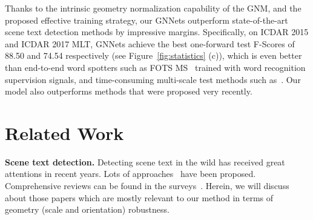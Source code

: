 \documentclass[10pt,twocolumn,letterpaper]{article}
\begin{document}
Thanks to the intrinsic geometry normalization capability of the GNM, and the proposed effective training strategy, our GNNets outperform
state-of-the-art scene text detection methods by impressive  margins.   Specifically,  on  ICDAR 2015 and ICDAR 2017 MLT,
GNNets achieve the best one-forward test F-Scores of 88.50 and 74.54 respectively (see Figure~\ref{fig:statistics} (c)), which is even better than end-to-end word spotters such as FOTS MS~\cite{liu2018fots} trained with word recognition supervision signals, and time-consuming multi-scale test methods such as~\cite{liu2018fots, Zhou2017}. Our model also outperforms methods \cite{Li2018pixel, li2018shape} that were proposed very recently.








\section{Related Work}

\textbf{Scene text detection.} Detecting scene text in the wild has received great attentions in recent years. Lots of approaches~\cite{Epshtein2010,neumann2010method, Neumann2012, Huang2013,uchida2014text,zhang2015symmetry, busta2015fastext,yin2015multi, Tian2016,zhong2016deeptext, Shi2017,Zhou2017,Hu2017,Liu2017,Jiang2017,Liao2017,liao2018rotation,lyu2018multi,liu2018fots,wang2018geometry,dai2018fused,li2018shape,Lyu2018,Yue2018} have been proposed. Comprehensive reviews can be found in the surveys~\cite{uchida2014text, ye2015text, zhu2016scene}. Herein,  we will discuss about those papers which are mostly relevant to our method in terms of geometry (scale and orientation) robustness.
\end{document}

